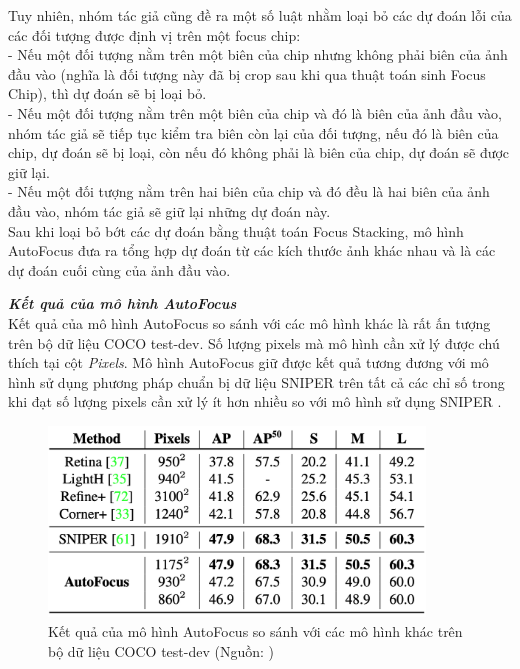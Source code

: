 {    \noindent
    Tuy nhiên, nhóm tác giả cũng đề ra một số luật nhằm loại bỏ các dự đoán lỗi của các đối tượng được định vị trên một focus chip: \\
    - Nếu một đối tượng nằm trên một biên của chip nhưng không phải biên của ảnh đầu vào (nghĩa là đối tượng này đã bị crop sau khi qua thuật toán sinh Focus Chip), thì dự đoán sẽ bị loại bỏ. \\
    - Nếu một đối tượng nằm trên một biên của chip và đó là biên của ảnh đầu vào, nhóm tác giả sẽ tiếp tục kiểm tra biên còn lại của đối tượng, nếu đó là biên của chip, dự đoán sẽ bị loại, còn nếu đó không phải là biên của chip, dự đoán sẽ được giữ lại. \\
    - Nếu một đối tượng nằm trên hai biên của chip và đó đều là hai biên của ảnh đầu vào, nhóm tác giả sẽ giữ lại những dự đoán này. \\
    Sau khi loại bỏ bớt các dự đoán bằng thuật toán Focus Stacking, mô hình AutoFocus  đưa ra tổng hợp dự đoán từ các kích thước ảnh khác nhau và là các dự đoán cuối cùng của ảnh đầu vào.

    \noindent
    \textbf{\textit{Kết quả của mô hình AutoFocus }} \\
    Kết quả của mô hình AutoFocus  so sánh với các mô hình khác là rất ấn tượng trên bộ dữ liệu COCO test-dev.
    Số lượng pixels  mà mô hình cần xử lý được chú thích tại cột \textit{Pixels}.
    Mô hình AutoFocus  giữ được kết quả tương đương với mô hình sử dụng phương pháp chuẩn bị dữ liệu SNIPER  trên tất cả các chỉ số trong khi đạt số lượng pixels  cần xử lý ít hơn nhiều so với mô hình sử dụng SNIPER .

    \begin{figure}[H]
        \centering
        \includegraphics[width=10cm] {images/autofocus_results_1}
        \caption{Kết quả của mô hình AutoFocus  so sánh với các mô hình khác trên bộ dữ liệu COCO test-dev (Nguồn: \cite{najibi2019autofocus})}
        \label{fig:autofocus_results_1}
    \end{figure}

}
